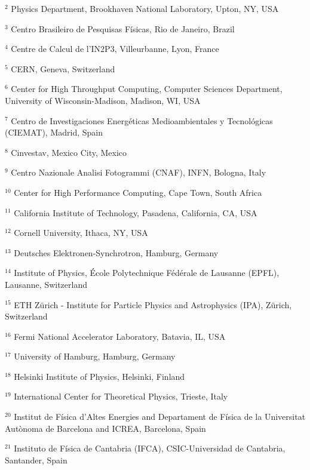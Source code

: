 \par {\footnotesize $^{2}$ Physics Department, Brookhaven National Laboratory, Upton, NY, USA}
\par {\footnotesize $^{3}$ Centro Brasileiro de Pesquisas Físicas, Rio de Janeiro, Brazil}
\par {\footnotesize $^{4}$ Centre de Calcul de l’IN2P3, Villeurbanne, Lyon, France}
\par {\footnotesize $^{5}$ CERN, Geneva, Switzerland}
\par {\footnotesize $^{6}$ Center for High Throughput  Computing, Computer Sciences Department, University of Wisconsin-Madison, Madison, WI, USA}
\par {\footnotesize $^{7}$ Centro de Investigaciones Energéticas Medioambientales y Tecnológicas (CIEMAT), Madrid, Spain}
\par {\footnotesize $^{8}$ Cinvestav, Mexico City, Mexico}
\par {\footnotesize $^{9}$ Centro Nazionale Analisi Fotogrammi (CNAF), INFN, Bologna, Italy}
\par {\footnotesize $^{10}$ Center for High Performance Computing, Cape Town, South Africa}
\par {\footnotesize $^{11}$ California Institute of Technology, Pasadena, California, CA, USA}
\par {\footnotesize $^{12}$ Cornell University, Ithaca, NY, USA}
\par {\footnotesize $^{13}$ Deutsches Elektronen-Synchrotron, Hamburg, Germany}
\par {\footnotesize $^{14}$ Institute of Physics, École Polytechnique Fédérale de Lausanne (EPFL), Lausanne, Switzerland}
\par {\footnotesize $^{15}$ ETH Zürich - Institute for Particle Physics and Astrophysics (IPA), Zürich, Switzerland}
\par {\footnotesize $^{16}$ Fermi National Accelerator Laboratory, Batavia, IL, USA}
\par {\footnotesize $^{17}$ University of Hamburg, Hamburg, Germany}
\par {\footnotesize $^{18}$ Helsinki Institute of Physics, Helsinki, Finland}
\par {\footnotesize $^{19}$ International Center for Theoretical Physics, Trieste, Italy}
\par {\footnotesize $^{20}$ Institut de Física d’Altes Energies and Departament de Física de la Universitat Autònoma de Barcelona and ICREA, Barcelona, Spain}
\par {\footnotesize $^{21}$ Instituto de Física de Cantabria (IFCA), CSIC-Universidad de Cantabria, Santander, Spain}
